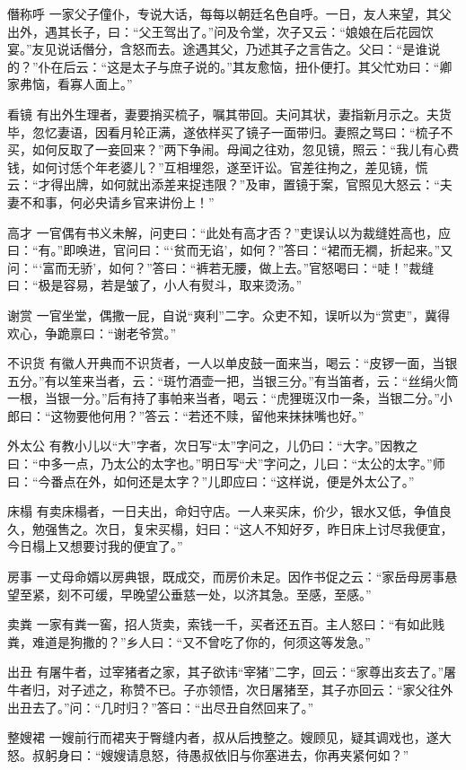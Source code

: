 \documentclass[12pt,UTF8]{ctexbook}
\begin{document}
僭称呼
一家父子僮仆，专说大话，每每以朝廷名色自呼。一日，友人来望，其父出外，遇其长子，曰：“父王驾出了。”问及令堂，次子又云：“娘娘在后花园饮宴。”友见说话僭分，含怒而去。途遇其父，乃述其子之言告之。父曰：“是谁说的？”仆在后云：“这是太子与庶子说的。”其友愈恼，扭仆便打。其父忙劝曰：“卿家弗恼，看寡人面上。”

看镜
有出外生理者，妻要捎买梳子，嘱其带回。夫问其状，妻指新月示之。夫货毕，忽忆妻语，因看月轮正满，遂依样买了镜子一面带归。妻照之骂曰：“梳子不买，如何反取了一妾回来？”两下争闹。母闻之往劝，忽见镜，照云：“我儿有心费钱，如何讨恁个年老婆儿？”互相埋怨，遂至讦讼。官差往拘之，差见镜，慌云：“才得出牌，如何就出添差来捉违限？”及审，置镜于案，官照见大怒云：“夫妻不和事，何必央请乡官来讲份上！”

高才
一官偶有书义未解，问吏曰：“此处有高才否？”吏误认以为裁缝姓高也，应曰：“有。”即唤进，官问曰：“‘贫而无谄’，如何？”答曰：“裙而无襉，折起来。”又问：“‘富而无骄’，如何？”答曰：“裤若无腰，做上去。”官怒喝曰：“唗！”裁缝曰：“极是容易，若是皱了，小人有熨斗，取来烫汤。”

谢赏
一官坐堂，偶撒一屁，自说“爽利”二字。众吏不知，误听以为“赏吏”，冀得欢心，争跪禀曰：“谢老爷赏。”

不识货
有徽人开典而不识货者，一人以单皮鼓一面来当，喝云：“皮锣一面，当银五分。”有以笙来当者，云：“斑竹酒壶一把，当银三分。”有当笛者，云：“丝绢火筒一根，当银一分。”后有持了事帕来当者，喝云：“虎狸斑汉巾一条，当银二分。”小郎曰：“这物要他何用？”答云：“若还不赎，留他来抹抹嘴也好。”

外太公
有教小儿以“大”字者，次日写“太”字问之，儿仍曰：“大字。”因教之曰：“中多一点，乃太公的太字也。”明日写“犬”字问之，儿曰：“太公的太字。”师曰：“今番点在外，如何还是太字？”儿即应曰：“这样说，便是外太公了。”

床榻
有卖床榻者，一日夫出，命妇守店。一人来买床，价少，银水又低，争值良久，勉强售之。次日，复宋买榻，妇曰：“这人不知好歹，昨日床上讨尽我便宜，今日榻上又想要讨我的便宜了。”

房事
一丈母命婿以房典银，既成交，而房价未足。因作书促之云：“家岳母房事悬望至紧，刻不可缓，早晚望公垂慈一处，以济其急。至感，至感。”

卖粪
一家有粪一窖，招人货卖，索钱一千，买者还五百。主人怒曰：“有如此贱粪，难道是狗撒的？”乡人曰：“又不曾吃了你的，何须这等发急。”

出丑
有屠牛者，过宰猪者之家，其子欲讳“宰猪”二字，回云：“家尊出亥去了。”屠牛者归，对子述之，称赞不已。子亦领悟，次日屠猪至，其子亦回云：“家父往外出丑去了。”问：“几时归？”答曰：“出尽丑自然回来了。”

整嫂裙
一嫂前行而裙夹于臀缝内者，叔从后拽整之。嫂顾见，疑其调戏也，遂大怒。叔躬身曰：“嫂嫂请息怒，待愚叔依旧与你塞进去，你再夹紧何如？”
\end{document}
